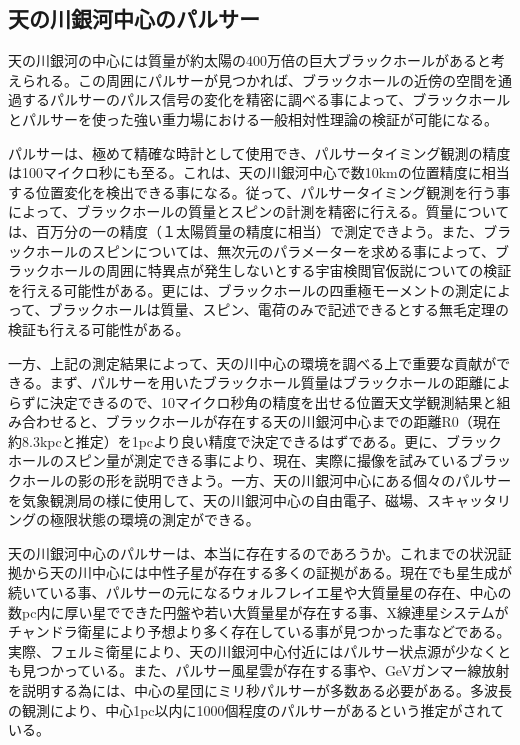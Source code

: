 \subsection{天の川銀河中心のパルサー}

天の川銀河の中心には質量が約太陽の400万倍の巨大ブラックホールがあると考えられる。この周囲にパルサーが見つかれば、ブラックホールの近傍の空間を通過するパルサーのパルス信号の変化を精密に調べる事によって、ブラックホールとパルサーを使った強い重力場における一般相対性理論の検証が可能になる。

パルサーは、極めて精確な時計として使用でき、パルサータイミング観測の精度は100マイクロ秒にも至る。これは、天の川銀河中心で数10kmの位置精度に相当する位置変化を検出できる事になる。従って、パルサータイミング観測を行う事によって、ブラックホールの質量とスピンの計測を精密に行える。質量については、百万分の一の精度（１太陽質量の精度に相当）で測定できよう。また、ブラックホールのスピンについては、無次元のパラメーターを求める事によって、ブラックホールの周囲に特異点が発生しないとする宇宙検閲官仮説についての検証を行える可能性がある。更には、ブラックホールの四重極モーメントの測定によって、ブラックホールは質量、スピン、電荷のみで記述できるとする無毛定理の検証も行える可能性がある。

一方、上記の測定結果によって、天の川中心の環境を調べる上で重要な貢献ができる。まず、パルサーを用いたブラックホール質量はブラックホールの距離によらずに決定できるので、10マイクロ秒角の精度を出せる位置天文学観測結果と組み合わせると、ブラックホールが存在する天の川銀河中心までの距離R0（現在約8.3kpcと推定）を1pcより良い精度で決定できるはずである。更に、ブラックホールのスピン量が測定できる事により、現在、実際に撮像を試みているブラックホールの影の形を説明できよう。一方、天の川銀河中心にある個々のパルサーを気象観測局の様に使用して、天の川銀河中心の自由電子、磁場、スキャッタリングの極限状態の環境の測定ができる。

天の川銀河中心のパルサーは、本当に存在するのであろうか。これまでの状況証拠から天の川中心には中性子星が存在する多くの証拠がある。現在でも星生成が続いている事、パルサーの元になるウォルフレイエ星や大質量星の存在、中心の数pc内に厚い星でできた円盤や若い大質量星が存在する事、X線連星システムがチャンドラ衛星により予想より多く存在している事が見つかった事などである。実際、フェルミ衛星により、天の川銀河中心付近にはパルサー状点源が少なくとも見つかっている。また、パルサー風星雲が存在する事や、GeVガンマー線放射を説明する為には、中心の星団にミリ秒パルサーが多数ある必要がある。多波長の観測により、中心1pc以内に1000個程度のパルサーがあるという推定がされている。

